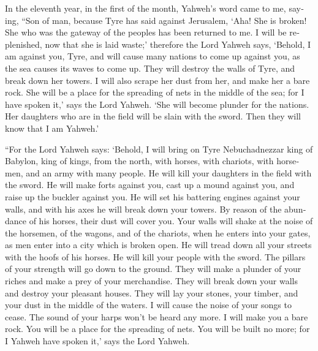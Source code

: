\begin{paracol}{2}
\begin{otherlanguage}{english}
 In the eleventh year, in the first of the month, Yahweh's
word came to me, saying,  ``Son of man, because Tyre has
said against Jerusalem, `Aha! She is broken! She who was the gateway of
the peoples has been returned to me. I will be replenished, now that she
is laid waste;'  therefore the Lord Yahweh says, `Behold,
I am against you, Tyre, and will cause many nations to come up against
you, as the sea causes its waves to come up.  They will
destroy the walls of Tyre, and break down her towers. I will also scrape
her dust from her, and make her a bare rock.  She will be
a place for the spreading of nets in the middle of the sea; for I have
spoken it,' says the Lord Yahweh. `She will become plunder for the
nations.  Her daughters who are in the field will be slain
with the sword. Then they will know that I am Yahweh.'

 ``For the Lord Yahweh says: `Behold, I will bring on Tyre
Nebuchadnezzar king of Babylon, king of kings, from the north, with
horses, with chariots, with horsemen, and an army with many people.
 He will kill your daughters in the field with the sword.
He will make forts against you, cast up a mound against you, and raise
up the buckler against you.  He will set his battering
engines against your walls, and with his axes he will break down your
towers.  By reason of the abundance of his horses, their
dust will cover you. Your walls will shake at the noise of the horsemen,
of the wagons, and of the chariots, when he enters into your gates, as
men enter into a city which is broken open.  He will
tread down all your streets with the hoofs of his horses. He will kill
your people with the sword. The pillars of your strength will go down to
the ground.  They will make a plunder of your riches and
make a prey of your merchandise. They will break down your walls and
destroy your pleasant houses. They will lay your stones, your timber,
and your dust in the middle of the waters.  I will cause
the noise of your songs to cease. The sound of your harps won't be heard
any more.  I will make you a bare rock. You will be a
place for the spreading of nets. You will be built no more; for I Yahweh
have spoken it,' says the Lord Yahweh.


\end{otherlanguage}
\end{paracol}
